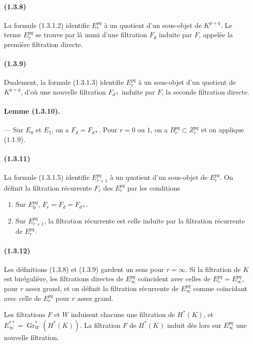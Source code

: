 \documentclass[10pt]{article}
\newcommand{\Gr}{\operatorname{Gr}}
\begin{document}
\paragraph{(1.3.8)} La formule (1.3.1.2) identifie $E_r^{pq}$ à un quotient d'un sous-objet de $K^{p+q}$. Le terme $E_r^{pq}$ se trouve par là muni d'une filtration $F_d$ induite par $F$, appelée la première filtration directe.

\paragraph{(1.3.9)} Dualement, la formule (1.3.1.3) identifie $E_r^{pq}$ à un sous-objet d'un quotient de $K^{p+q}$, d'où une nouvelle filtration $F_{d*}$ induite par $F$, la seconde filtration directe.

\paragraph{Lemme (1.3.10).} --- Sur $E_0$ et $E_1$, on a $F_d=F_{d*}$. Pour $r=0$ ou $1$, on a $B_r^{pq}\subset Z_r^{pq}$ et on applique (1.1.9).

\paragraph{(1.3.11)} La formule (1.3.1.5) identifie $E_{r+1}^{pq}$ à un quotient d'un sous-objet de $E_r^{pq}$. On définit la filtration récurrente $F_r$ des $E_r^{pq}$ par les conditions
\begin{enumerate}[label=(\roman*)]
\item Sur $E_0^{pq}$, $F_r=F_d=F_{d*}$.
\item Sur $E_{r+1}^{pq}$, la filtration récurrente est celle induite par la filtration récurrente de $E_r^{pq}$.
\end{enumerate}

\paragraph{(1.3.12)} Les définitions (1.3.8) et (1.3.9) gardent un sens pour $r=\infty$. Si la filtration de $K$ est birégulière, les filtrations directes de $E_\infty^{pq}$ coïncident avec celles de $E_r^{pq}=E_\infty^{pq}$, pour $r$ assez grand, et on définit la filtration récurrente de $E_\infty^{pq}$ comme coïncidant avec celle de $E_r^{pq}$ pour $r$ assez grand.

Les filtrations $F$ et $W$ induisent chacune une filtration de $H^*(K)$, et $E_\infty^{**}=\Gr_W^*(H^*(K))$. La filtration $F$ de $H^*(K)$ induit dès lors sur $E_\infty^{pq}$ une nouvelle filtration.
\end{document}
